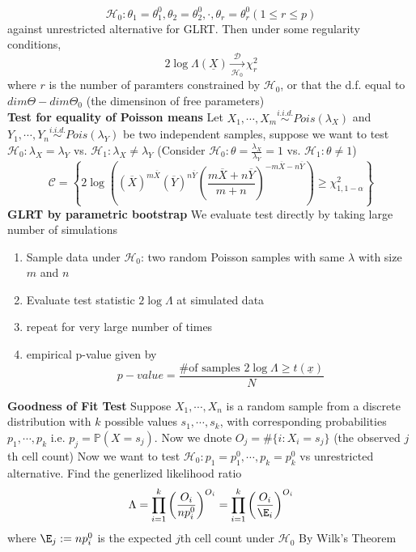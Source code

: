 \documentclass[8pt]{article}
\begin{document}
\begin{multicols}{3}
{   \[
     \mathcal{H}_0: \theta_1 = \theta_1^0, \theta_2 = \theta_2^0, \cdot, \theta_r = \theta_r^0 (1 \leq r \leq p)
   \]
   against unrestricted alternative for GLRT. Then under some regularity conditions,
   \[
     2\log \Lambda(\underline{X}) \xrightarrow[\mathcal{H}_0]{\mathcal{D}} \chi_r^2
   \]
   where $r$ is the number of paramters constrained by $\mathcal{H}_0$, or that the d.f. equal to $dim \Theta - dim \Theta_0$ (the dimensinon of free parameters)\\
   \textbf{Test for equality of Poisson means} Let $X_1, \cdots, X_m \stackrel{i.i.d.}{\sim} Pois(\lambda_X)$ and $Y_1, \cdots, Y_n \stackrel{i.i.d.}{\sim} Pois(\lambda_Y)$ be two independent samples, suppose we want to test $\mathcal{H}_0: \lambda_X = \lambda_Y$ vs. $\mathcal{H}_1: \lambda_X \neq \lambda_Y$ (Consider $\mathcal{H}_0: \theta = \frac{\lambda_X}{\lambda_Y} = 1$ vs. $\mathcal{H}_1: \theta \neq 1$)
   \[
    \mathcal{C} = \left\{ 2\log \left( (\overline{X})^{m\overline{X}}(\overline{Y})^{n\overline{Y}} \left( \frac{m\overline{X} + n\overline{Y}}{m+n} \right)^{-m\overline{X}-n\overline{Y}} \right) \geq \chi_{1,1-\alpha}^2 \right\}
   \]
   \textbf{GLRT by parametric bootstrap} We evaluate test directly by taking large number of simulations
   \begin{enumerate}
     \item Sample data under $\mathcal{H}_0$: two random Poisson samples with same $\lambda$ with size $m$ and $n$
     \item Evaluate test statistic $2\log \Lambda$ at simulated data
     \item repeat for very large number of times
     \item empirical p-value given by
     \[
       p-value = \frac{\text{\# of samples }2\log \Lambda \geq t(\underline{x})}{N}
     \]
   \end{enumerate}
   \textbf{Goodness of Fit Test} Suppose $X_1, \cdots, X_n$ is a random sample from a discrete distribution with $k$ possible values $s_1, \cdots, s_k$, with corresponding probabilities $p_1, \cdots, p_k$ i.e. $p_j = \mathbb{P}(X = s_j)$. Now we dnote $O_j = \# \{ i: X_i = s_j\}$ (the observed $j$th cell count) Now we want to test $\mathcal{H}_0: p_1 = p_1^0, \cdots, p_k = p_k^0$ vs unrestricted alternative. Find the generlized likelihood ratio
   \[
     \Lambda = \prod_{i=1}^k \left( \frac{O_i}{np_i^0} \right)^{O_i} = \prod_{i=1}^k \left( \frac{O_i}{\E_i} \right)^{O_i}
   \]
   where $\E_j := np_i^0$ is the expected $j$th cell count under $\mathcal{H}_0$ By Wilk's Theorem
}
\end{multicols}
\end{document}
